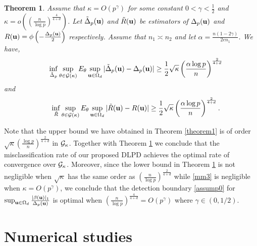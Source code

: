 \documentclass[11pt]{article}
\newtheorem{thm}{Theorem}%
\theoremstyle{definition}
\begin{document}
 \begin{thm}\label{thminimax}
 	Assume that $\kappa=O(p^{\gamma})$ for some constant $0<\gamma<\frac{1}{2}$ and $\kappa=o\left(\left(\frac{n}{\log p}\right)^{\frac{4}{4+d}}\right)$. Let $\tilde{\Delta}_p({\bf u})$ and $\tilde{R}({\bf u})$ be estimators of $\Delta_p({\bf u})$ and $R({\bf u})=\phi\left(-\frac{\Delta_p(\bf u)}{2} \right)$ respectively. Assume that $n_1\asymp n_2$ and let $\alpha=\frac{n(1-2\gamma)}{2en_1}$. We have,
 	\begin{eqnarray}\label{minimax1}
 		~~~~\inf_{\tilde{\Delta}_p}\sup_{\theta\in{\cal G}(\kappa)}E_\theta\sup_{{\bf u}\in \Omega_d}|\tilde{\Delta}_p({\bf u})-\Delta_p({\bf u})| \geq \frac{1}{2}\sqrt{\kappa}\left(\frac{\alpha\log p}{n}\right)^{\frac{2}{4+d}}
 	\end{eqnarray}
 	and
 	\begin{eqnarray}\label{minimax2}
 		~~~~\inf_{\tilde{R}}\sup_{\theta\in{\cal G}(\kappa)}E_\theta\sup_{{\bf u}\in \Omega_d}|\tilde{R}({\bf u})-R({\bf u})| \geq \frac{1}{2}\sqrt{\kappa}\left(\frac{\alpha \log p}{n}\right)^{\frac{2}{4+d}}.
 	\end{eqnarray}
 \end{thm}
 
 Note that the upper bound we have obtained in Theorem \ref{theorem1} is of order $\sqrt{\kappa}\left(\frac{\log p}{n}\right)^{\frac{2}{4+d}}$ in ${\cal G}_{\kappa}$. Together with Theorem \ref{thminimax} we conclude that the misclassification rate of our proposed DLPD achieves the optimal rate of convergence over ${\cal G}_{\kappa}$.  Moreover,  since the lower bound in Theorem \ref{thminimax} is not negligible when $\sqrt{\kappa}$ has the same order as $\left(\frac{n}{\log p}\right)^{\frac{2}{4+d}}$ while \eqref{mm3} is negligible when $\kappa=O(p^{\gamma})$, we conclude that the detection boundary \eqref{assump0} for $\sup_{{\bf u}\in \Omega_d}\frac{ |\beta({\bf u})|_1}{\Delta_p({\bf u})}$ is optimal when $\left(\frac{n}{\log p}\right)^{\frac{4}{4+d}} =O(p^{\gamma})$ where $\gamma \in (0,1/2)$.  
 \section{Numerical studies}
 
\end{document}
